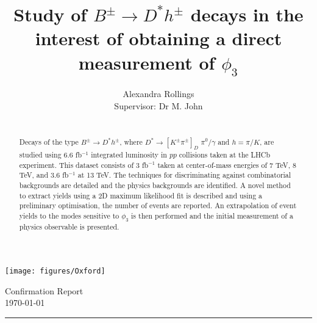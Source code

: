 \documentclass[oneside,12pt]{article}
\title{ \LARGE \textbf{Study of $B^{\pm} \rightarrow D^{*}h^{\pm}$ decays in the
interest of obtaining a direct measurement of $\phi_3$} \\ }
\author{
		Alexandra Rollings\\	
		Supervisor: Dr M. John\\	
}
\makeatletter
\newcommand{\HRule}[1]{\rule{\linewidth}{#1}}     %
\def\printtitle{%
  {\centering \@title\par}}
\def\printauthor{%
  {\centering \large \@author}}
\makeatother
\begin{document}
\begin{titlepage}
\begin{nolinenumbers}
\thispagestyle{empty} 

\begin{minipage}[c]{.15\linewidth}
  \texttt{[image: figures/Oxford]}
\end{minipage}\hfill
\begin{minipage}[c]{.75\linewidth}
  \begin{flushright}
  \normalsize {Confirmation Report} 	%
  \\ \normalsize \today			%
  \end{flushright}
\end{minipage}



\HRule{0.5pt} \\						%
[2.0cm]
\printtitle 
\vspace{75pt}
\printauthor
\vfill
\begin{abstract}
\noindent
\\
Decays of the type $B^{\pm} \rightarrow D^{*}h^{\pm}$, where $D^{*} \rightarrow
[K^{\pm}\pi^{\pm}]_D$ $\pi^{0}\text{/}\gamma$ and $h=\pi/K$, are studied using
6.6 fb$^{-1}$ integrated luminosity in $pp$ collisions taken at the LHCb
experiment. This dataset consists of 3 fb${^{-1}}$ taken at center-of-mass
energies of 7 TeV, 8 TeV, and 3.6 fb${^{-1}}$ at 13 TeV. The techniques for
discriminating against combinatorial backgrounds are detailed and the physics
backgrounds are identified. A novel method to extract yields using a 2D maximum
likelihood fit is described and using a preliminary optimisation, the number of
events are reported. An extrapolation of event yields to the modes sensitive to
$\phi_3$ is then performed and the initial measurement of a physics observable
is presented.
\end{abstract}
\vfill
\end{nolinenumbers}
\end{titlepage}
\setcounter{page}{1}
\end{document}
